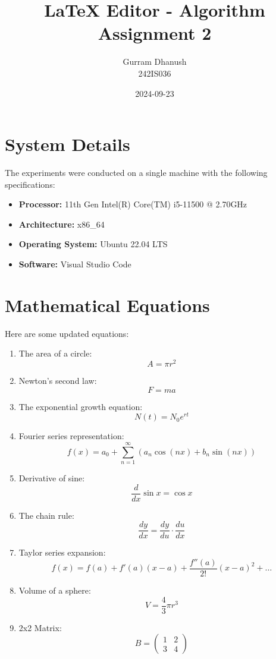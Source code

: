 \documentclass{article}
\begin{document}
\title{LaTeX Editor - Algorithm Assignment 2}
\author{Gurram Dhanush \\ 242IS036}
\date{2024-09-23}
\maketitle

\section{System Details}
The experiments were conducted on a single machine with the following specifications:
\begin{itemize}
    \item \textbf{Processor:} 11th Gen Intel(R) Core(TM) i5-11500 @ 2.70GHz
    \item \textbf{Architecture:} x86\_64
    \item \textbf{Operating System:} Ubuntu 22.04 LTS
    \item \textbf{Software:} Visual Studio Code
\end{itemize}

\section{Mathematical Equations}
Here are some updated equations:
\begin{enumerate}
    \item The area of a circle:
    \[
    A = \pi r^2
    \]
    \item Newton's second law:
    \[
    F = ma
    \]
    \item The exponential growth equation:
    \[
    N(t) = N_0 e^{rt}
    \]
    \item Fourier series representation:
    \[
    f(x) = a_0 + \sum_{n=1}^{\infty} \left( a_n \cos(nx) + b_n \sin(nx) \right)
    \]
    \item Derivative of sine:
    \[
    \frac{d}{dx}\sin x = \cos x
    \]
    \item The chain rule:
    \[
    \frac{dy}{dx} = \frac{dy}{du} \cdot \frac{du}{dx}
    \]
    \item Taylor series expansion:
    \[
    f(x) = f(a) + f'(a)(x - a) + \frac{f''(a)}{2!}(x - a)^2 + \dots
    \]
    \item Volume of a sphere:
    \[
    V = \frac{4}{3} \pi r^3
    \]
    \item 2x2 Matrix:
    \[
    B = \begin{pmatrix}
    1 & 2 \\
    3 & 4
    \end{pmatrix}
    \]
\end{enumerate}
\end{document}
